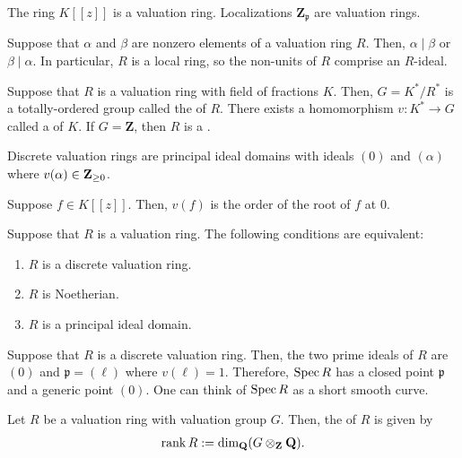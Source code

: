 \documentclass [11 pt, oneside] {article}
\begin{document}
\begin{example}\label{}\text{}
The ring $K [\![z]\!]$ is a valuation ring. Localizations $\mathbf{Z}_{\mathfrak{p}}$ are valuation rings.
\end{example}

Suppose that $\alpha$ and $\beta$ are nonzero elements of a valuation ring $R$. Then, $\alpha\mid \beta$ or $\beta\mid \alpha$. In particular, $R$ is a local ring, so the non-units of $R$ comprise an $R$-ideal.

Suppose that $R$ is a valuation ring with field of fractions $K$. Then, $G = K^*/R^*$ is a totally-ordered group called the  of $R$. There exists a homomorphism $v : K^* \longrightarrow G$ called a  of $K$. If $G=\mathbf{Z}$, then $R$ is a .

Discrete valuation rings are principal ideal domains with ideals $(0)$ and $(\alpha)$ where $v(\alpha)\in \mathbf Z_{\ge 0}$. 

Suppose $f\in K[\![z]\!]$. Then, $v(f)$ is the order of the root of $f$ at $0$.

\begin{proposition}[ ]\label{}\text{}
Suppose that $R$ is a valuation ring. The following conditions are equivalent:
\begin{enumerate}
	\item $R$ is a discrete valuation ring.
	\item $R$ is Noetherian.
	\item $R$ is a principal ideal domain.
\end{enumerate}
\end{proposition}

Suppose that $R$ is a discrete valuation ring. Then, the two prime ideals of $R$ are $(0)$ and $\mathfrak{p}= (\ell)$ where $v(\ell)=1$. Therefore, $\operatorname{Spec} R$ has a closed point $\mathfrak{p}$ and a generic point $(0)$. One can think of $\operatorname{Spec} R$ as a short smooth curve.

\begin{definition}[ ]\label{}\text{}
Let $R$ be a valuation ring with valuation group $G$. Then, the  of $R$ is given by
\begin{align*}
	\operatorname{rank} R := \dim_\mathbf{Q} (G\otimes_\mathbf{Z}\mathbf{Q}).
\end{align*}
\end{definition}
\end{document}
